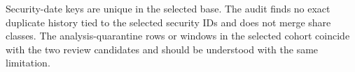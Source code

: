 Security-date keys are unique in the selected base. The audit finds no exact
duplicate history tied to the selected security IDs and does not merge share
classes. The \QuarantineRowsWindows{} analysis-quarantine rows or windows in
the selected cohort coincide with the two review candidates and should be
understood with the same limitation.
